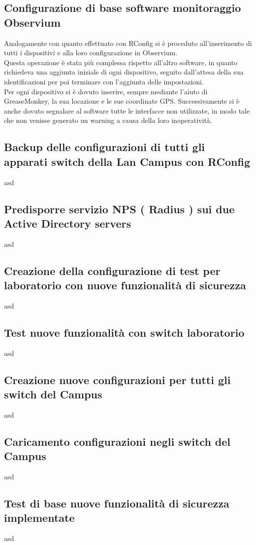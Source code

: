 \documentclass[Realizzazione.tex]{subfiles}
\begin{document}
\subsection{Configurazione di base software monitoraggio Observium}
Analogamente con quanto effettuato con RConfig si è proceduto all'inserimento di tutti i dispositivi e alla loro configurazione in Observium. \\
Questa operazione è stata più complessa rispetto all'altro software, in quanto richiedeva una aggiunta iniziale di ogni dispositivo, seguito dall'attesa della sua identificazioni per poi terminare con l'aggiunta delle impostazioni. \\
Per ogni dispositivo si è dovuto inserire, sempre mediante l'aiuto di GreaseMonkey, la sua locazione e le sue coordinate GPS. Successivamente si è anche dovuto segnalare al software tutte le interfacce non utilizzate, in modo tale che non venisse generato un warning a causa della loro inoperatività.

\subsection{Backup delle configurazioni di tutti gli apparati switch della Lan Campus con RConfig} 
asd
\subsection{Predisporre servizio NPS ( Radius ) sui due Active Directory servers} 
asd
\subsection{Creazione della configurazione di test per laboratorio con nuove funzionalità di sicurezza} 
asd
\subsection{Test nuove funzionalità con switch laboratorio} 
asd
\subsection{Creazione nuove configurazioni per tutti gli switch del Campus} 
asd
\subsection{Caricamento configurazioni negli switch del Campus} 
asd
\subsection{Test di base nuove funzionalità di sicurezza implementate} 
asd
\end{document}
